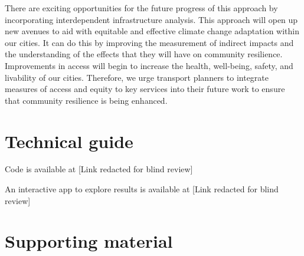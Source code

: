 \documentclass[review,3p,times,onecolumn,sort&compress,12pt]{elsarticle}
\begin{document}
There are exciting opportunities for the future progress of this approach by incorporating interdependent infrastructure analysis.
This approach will open up new avenues to aid with equitable and effective climate change adaptation within our cities.
It can do this by improving the measurement of indirect impacts and the understanding of the effects that they will have on community resilience.
Improvements in access will begin to increase the health, well-being, safety, and livability of our cities.
Therefore, we urge transport planners to integrate measures of access and equity to key services into their future work to ensure that community resilience is being enhanced.



\printbibliography

\clearpage
\newpage
\appendix

\section{Technical guide}

\noindent Code is available at [Link redacted for blind review] %

\noindent An interactive app to explore results is available at [Link redacted for blind review]


\clearpage
\section{Supporting material}
\end{document}
